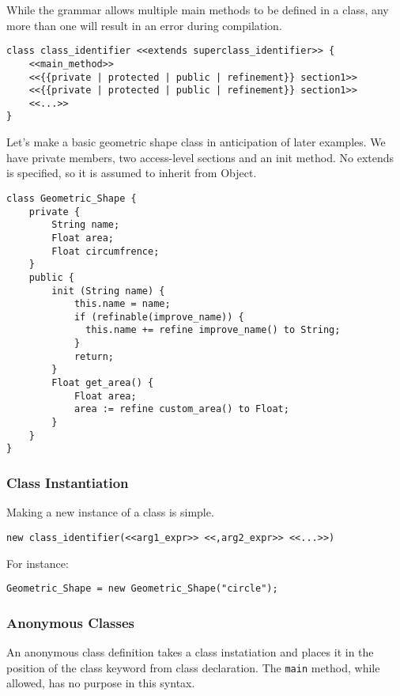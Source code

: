 While the grammar allows multiple main methods to be defined in a class, any more than one will result in an error during compilation.

\begin{lstlisting}
class class_identifier <<extends superclass_identifier>> {
    <<main_method>>
    <<{{private | protected | public | refinement}} section1>>
    <<{{private | protected | public | refinement}} section1>>
    <<...>>
}
\end{lstlisting}

Let's make a basic geometric shape class in anticipation of later examples. We have private members, two access-level sections and an init method. No extends is specified, so it is assumed to inherit from Object.


\begin{lstlisting}[backgroundcolor=\color{tintedorange},label=Method Invocation,caption=Class Declaration for a Geometric Shape class]
class Geometric_Shape {
    private {
        String name;
        Float area;
        Float circumfrence;
    }
    public {
        init (String name) {
            this.name = name;
            if (refinable(improve_name)) {
              this.name += refine improve_name() to String;
            }
            return;
        }
        Float get_area() {
            Float area;
            area := refine custom_area() to Float;
        }
    }
}
\end{lstlisting}

\subsubsection{Class Instantiation}
Making a new instance of a class is simple.

\begin{lstlisting}
new class_identifier(<<arg1_expr>> <<,arg2_expr>> <<...>>)
\end{lstlisting}

For instance:

\begin{lstlisting}[backgroundcolor=\color{tintedorange},label=Method Invocation,caption=Class Instantiation for a Geometric Shape class]
Geometric_Shape = new Geometric_Shape("circle");
\end{lstlisting}

\subsubsection{Anonymous Classes}
An anonymous class definition takes a class instatiation and places it in the position of the class keyword from class declaration. The \verb!main! method, while allowed, has no purpose in this syntax.

